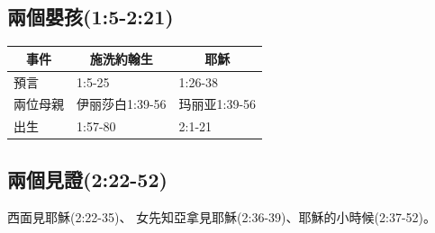 \subsection{兩個嬰孩(1:5-2:21)}
\begin{table}[H]
\centering
\begin{tabular}{p{4.37cm}|p{1.5cm}|p{1.5cm}}\hline\hline
\multicolumn{1}{c|}{事件}&\multicolumn{1}{c|}{施洗約翰生}&\multicolumn{1}{c}{耶穌}\\\hline
預言&1:5-25&1:26-38\\\hline
兩位母親&伊丽莎白1:39-56&玛丽亚1:39-56\\\hline
出生&1:57-80&2:1-21\\\hline
\end{tabular}
\end{table}

\subsection{兩個見證(2:22-52)}
西面見耶穌(2:22-35)、
女先知亞拿見耶穌(2:36-39)、耶穌的小時候(2:37-52)。

